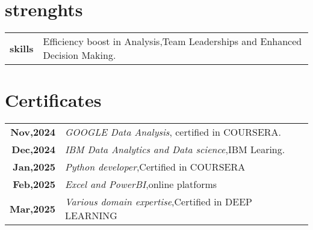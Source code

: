 \documentclass[lighthipster]{simplehipstercv}
\newlength{\rightcolwidth}
\begin{document}
\begin{paracol}{2}
\begin{minipage}[t]{0.3\textwidth}
\section*{strenghts}
\begin{tabular}{>{\footnotesize\bfseries}r >{\footnotesize}p{}}
    skills& Efficiency boost in Analysis,Team Leaderships and Enhanced Decision Making.\end{tabular}

\end{minipage}\hfill
\begin{minipage}[t]{0.3\textwidth}
\section*{Certificates}
\begin{tabular}{>{\footnotesize\bfseries}r >{\footnotesize}p{}}
    Nov,2024& \emph{GOOGLE Data Analysis}, certified in COURSERA.\\
    Dec,2024&  \emph{IBM Data Analytics and Data science},IBM Learing.\\
 Jan,2025&\emph{Python developer},Certified in COURSERA\\
 Feb,2025&\emph{Excel and PowerBI},online platforms\\
 Mar,2025&\emph{Various domain expertise},Certified in DEEP LEARNING\\\end{tabular}
\bigskip
\end{minipage}

\vfill{} %

\setlength{\parindent}{0pt}
\begin{minipage}[t]{\rightcolwidth}
\begin{center}\fontfamily{\sfdefault}\selectfont \color{black!70}

\end{center}
\end{minipage}

\end{paracol}
\end{document}
